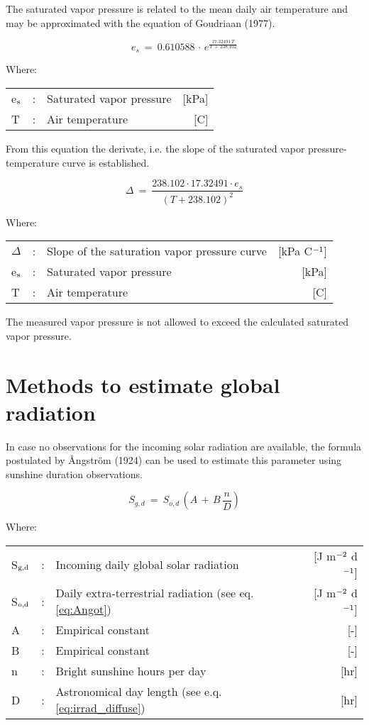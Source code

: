 The saturated vapor pressure is related to the mean daily air temperature and may be
approxi\-mated with the equation of Goudriaan (1977). 

\begin{equation}
\label{eq:SVP}
e_{s} ~=~ 0.610588\, \cdot \, e ^{{\frac{17.32491\, T}{T\, +\, 238.102}} }
\end{equation}

Where:\\[5pt]
\begin{tabularx}{\textwidth}{llXr}
	e$_{{\rm s}}$ &:& Saturated vapor pressure  & [kPa]\\
	T &:& Air temperature & [\degrees C]
\end{tabularx}

From this equation the derivate, i.e. the slope of the saturated vapor pressure-temperature
curve is established.

\begin{equation}
\label{eq:SlopeSVP}
\Delta ~=~{\frac{238.102 \cdot 17.32491 \cdot e_{s} }{(T + 238.102)^{2} }}
\end{equation}

Where:\\[5pt]
\begin{tabularx}{\textwidth}{llXr}
	$\Delta$ &:& Slope of the saturation vapor pressure curve  & [kPa \degrees C$^{{\rm -1}}$]\\
	e$_{{\rm s}}$ &:& Saturated vapor pressure &  [kPa]\\
	T &:& Air temperature & [\degrees C]
\end{tabularx}

The measured vapor pressure is not allowed to exceed the calculated saturated vapor
pressure.

\section{Methods to estimate global radiation}

In case no observations for the incoming solar radiation are available, the formula
postulated by \AA ngstr\"{o}m (1924) can be used to estimate this parameter using sunshine
duration observations.

\begin{equation}
\label{eq:GlobRad}
S _{g,d} ~=~S _{o,d} \, (A\, +\, B\,{\frac{n}{D}} )
\end{equation}

Where:\\[5pt]
\begin{tabularx}{\textwidth}{llXr}
	S$_{{\rm g,d}}$ &:& Incoming daily global solar radiation  & [J m$^{{\rm -2}}$ d$^{{\rm -1}}$]\\
	S$_{{\rm o,d}}$ &:& Daily extra-terrestrial radiation (see eq. \ref{eq:Angot}) 
	& [J m$^{{\rm -2}}$ d$^{{\rm -1}}$]\\
	A &:& Empirical constant  & [-]\\
	B &:& Empirical constant  & [-]\\
	n &:& Bright sunshine hours per day  & [hr]\\
	D &:& Astronomical day length (see e.q. \ref{eq:irrad_diffuse})  & [hr]
\end{tabularx}

